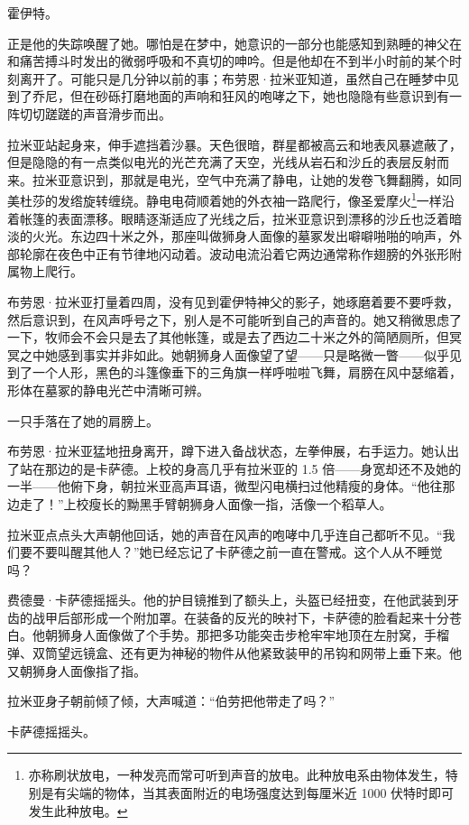 \documentclass[AutoFakeBold=true]{book}
\begin{document}
{\kaishu 霍伊特。}

正是他的失踪唤醒了她。哪怕是在梦中，她意识的一部分也能感知到熟睡的神父在和痛苦搏斗时发出的微弱呼吸和不真切的呻吟。但是他却在不到半小时前的某个时刻离开了。可能只是几分钟以前的事；布劳恩·拉米亚知道，虽然自己在睡梦中见到了乔尼，但在砂砾打磨地面的声响和狂风的咆哮之下，她也隐隐有些意识到有一阵切切蹉蹉的声音滑步而出。

拉米亚站起身来，伸手遮挡着沙暴。天色很暗，群星都被高云和地表风暴遮蔽了，但是隐隐的有一点类似电光的光芒充满了天空，光线从岩石和沙丘的表层反射而来。拉米亚意识到，那就是电光，空气中充满了静电，让她的发卷飞舞翻腾，如同美杜莎的发绺旋转缠绕。静电电荷顺着她的外衣袖一路爬行，像圣爱摩火\footnote{亦称刷状放电，一种发亮而常可听到声音的放电。此种放电系由物体发生，特别是有尖端的物体，当其表面附近的电场强度达到每厘米近 1000 伏特时即可发生此种放电。}一样沿着帐篷的表面漂移。眼睛逐渐适应了光线之后，拉米亚意识到漂移的沙丘也泛着暗淡的火光。东边四十米之外，那座叫做狮身人面像的墓冢发出噼噼啪啪的响声，外部轮廓在夜色中正有节律地闪动着。波动电流沿着它两边通常称作翅膀的外张形附属物上爬行。

布劳恩·拉米亚打量着四周，没有见到霍伊特神父的影子，她琢磨着要不要呼救，然后意识到，在风声呼号之下，别人是不可能听到自己的声音的。她又稍微思虑了一下，牧师会不会只是去了其他帐篷，或是去了西边二十米之外的简陋厕所，但冥冥之中她感到事实并非如此。她朝狮身人面像望了望——只是略微一瞥——似乎见到了一个人形，黑色的斗篷像垂下的三角旗一样呼啦啦飞舞，肩膀在风中瑟缩着，形体在墓冢的静电光芒中清晰可辨。

一只手落在了她的肩膀上。

布劳恩·拉米亚猛地扭身离开，蹲下进入备战状态，左拳伸展，右手运力。她认出了站在那边的是卡萨德。上校的身高几乎有拉米亚的 1.5 倍——身宽却还不及她的一半——他俯下身，朝拉米亚高声耳语，微型闪电横扫过他精瘦的身体。``他往那边走了！''上校瘦长的黝黑手臂朝狮身人面像一指，活像一个稻草人。

拉米亚点点头大声朝他回话，她的声音在风声的咆哮中几乎连自己都听不见。``我们要不要叫醒其他人？''她已经忘记了卡萨德之前一直在警戒。这个人从不睡觉吗？

费德曼·卡萨德摇摇头。他的护目镜推到了额头上，头盔已经扭变，在他武装到牙齿的战甲后部形成一个附加罩。在装备的反光的映衬下，卡萨德的脸看起来十分苍白。他朝狮身人面像做了个手势。那把多功能突击步枪牢牢地顶在左肘窝，手榴弹、双筒望远镜盒、还有更为神秘的物件从他紧致装甲的吊钩和网带上垂下来。他又朝狮身人面像指了指。

拉米亚身子朝前倾了倾，大声喊道：``伯劳把他带走了吗？''

卡萨德摇摇头。
\end{document}
